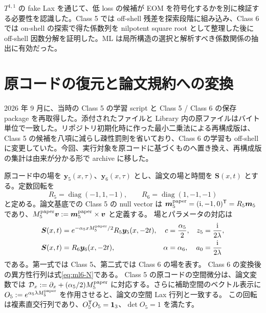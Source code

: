 \begin{historymemo}
$T^{1,1}$ の fake Lax を通じて、低 loss の候補が EOM を符号化するかを別に検証する必要性を認識した。Class 5 では off-shell 残差を探索段階に組み込み、Class 6 では on-shell の探索で得た係数列を nilpotent square root として整理した後に off-shell 因数分解を証明した。ML は局所構造の選択と解析すべき係数関係の抽出に有効だった。
\end{historymemo}

\section{原コードの復元と論文規約への変換}
\label{sec:ml-restored-conventions}
2026 年 9 月に、当時の Class 5 の学習 script と Class 5 / Class 6 の保存 package を再取得した。添付されたファイルと Library 内の原ファイルはバイト単位で一致した。リポジトリ初期化時に作った最小二乗法による再構成版は、Class 5 の候補を八項に減らし疎性罰則を省いており、Class 6 の学習も off-shell に変更していた。今回、実行対象を原コードに基づくものへ置き換え、再構成版の集計は由来が分かる形で archive に移した。

原コード中の場を $\boldsymbol y_5(x,\tau)$、$\boldsymbol y_6(x,\tau)$ とし、論文の場と時間を $\boldsymbol S(x,t)$ とする。定数回転を
\begin{equation}
R_5=\operatorname{diag}(-1,1,-1),\qquad
R_6=\operatorname{diag}(1,-1,-1)
\end{equation}
と定める。論文基底での Class 5 の null vector は
$\boldsymbol m_5^{\rm paper}=(\mathrm i,-1,0)^{\mathsf T}=R_5\boldsymbol m_5$
であり、$M_5^{\rm paper}\boldsymbol v
:=\boldsymbol m_5^{\rm paper}\times\boldsymbol v$ と定義する。
場とパラメータの対応は
\begin{align}
\boldsymbol S(x,t)
&=e^{-\alpha_5xM_5^{\rm paper}/2}R_5\boldsymbol y_5(x,-2t),
&c&=\frac{\alpha_5}{2},
&z_5&=\frac{\mathrm i}{2\lambda},
\label{eq:ml5-paper-dictionary}\\
\boldsymbol S(x,t)
&=R_6\boldsymbol y_6(x,-2t),
&\alpha&=\alpha_6,
&a_0&=\frac{\mathrm i}{2\lambda}
\label{eq:ml6-paper-dictionary}
\end{align}
である。第一式では Class 5、第二式では Class 6 の場を表す。
Class 6 の変換後の異方性行列は式\eqref{eq:ml6-N}である。
Class 5 の原コードの空間微分は、論文変数では
$\mathcal D_x:=\partial_x+(\alpha_5/2)M_5^{\rm paper}$
に対応する。さらに補助空間のベクトル表示に
$O_5:=e^{\alpha_5\lambda M_5^{\rm paper}}$
を作用させると、論文の空間 Lax 行列と一致する。
この回転は複素直交行列であり、$O_5^{\mathsf T}O_5=\mathbf 1_{3}$、$\det O_5=1$ を満たす。


